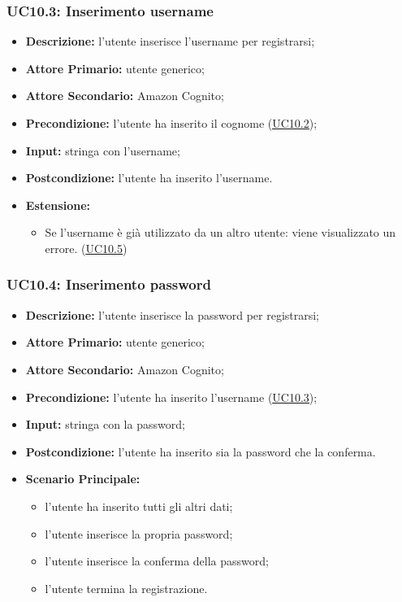 \subsubsection{UC10.3: Inserimento username}
\label{sec:UC10.3}
\begin{itemize}
    \item \textbf{Descrizione:} l'utente inserisce l'username per registrarsi;
    \item \textbf{Attore Primario:} utente generico;
    \item \textbf{Attore Secondario:} Amazon Cognito;
    \item \textbf{Precondizione:} l'utente ha inserito il cognome (\hyperref[sec:UC10.2]{\underline{UC10.2}});
    \item \textbf{Input:} stringa con l'username;
    \item \textbf{Postcondizione:} l'utente ha inserito l'username.
    \item \textbf{Estensione:} 
    \begin{itemize}
        \item Se l'username è già utilizzato da un altro utente: viene visualizzato un errore. (\hyperref[sec:UC10.5]{\underline{UC10.5}}) 
    \end{itemize} 
\end{itemize}

\subsubsection{UC10.4: Inserimento password}
\label{sec:UC10.4}
\begin{itemize}
    \item \textbf{Descrizione:} l'utente inserisce la password per registrarsi;
    \item \textbf{Attore Primario:} utente generico;
    \item \textbf{Attore Secondario:} Amazon Cognito;
    \item \textbf{Precondizione:} l'utente ha inserito l'username (\hyperref[sec:UC10.3]{\underline{UC10.3}});
    \item \textbf{Input:} stringa con la password;
    \item \textbf{Postcondizione:} l'utente ha inserito sia la password che la conferma.
    \item \textbf{Scenario Principale:}
        \begin{itemize}
            \item l'utente ha inserito tutti gli altri dati;
            \item l'utente inserisce la propria password;
            \item l'utente inserisce la conferma della password;
            \item l'utente termina la registrazione.
        \end{itemize} 
\end{itemize}

